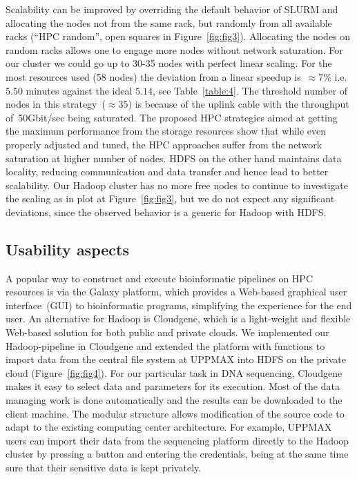 \documentclass[10pt]{article}
\begin{document}
Scalability can be improved by overriding the default behavior of SLURM and allocating the nodes not from the same rack, but randomly from all available racks (``HPC random'', open squares in Figure~\ref{fig:fig3}). Allocating the nodes on random racks allows one to engage more nodes without network saturation. For our cluster we could go up to 30-35 nodes with perfect linear scaling. For the most resources used (58 nodes) the deviation from a linear speedup is~$\approx 7\%$ i.e. $5.50$ minutes against the ideal $5.14$, see Table~\ref{table:4}. The threshold number of nodes in this strategy~($\approx35$) is because of the uplink cable with the throughput of~50Gbit/sec being saturated. 
The proposed HPC strategies aimed at getting the maximum performance from the storage resources show that while even properly adjusted and tuned, the HPC approaches suffer from the network saturation at higher number of nodes.
HDFS on the other hand maintains data locality, reducing communication and data transfer and hence lead to better scalability.
Our Hadoop cluster has no more free nodes to continue to investigate the scaling as in plot at Figure~\ref{fig:fig3}, but we do not expect any significant deviations, since the observed behavior is a generic for Hadoop with HDFS\cite{lin2010, Hadoop:Guide}. 


\subsection*{Usability aspects}
\label{subsectionIV_2}

A popular way to construct and execute bioinformatic pipelines on HPC resources is via the Galaxy\cite{galaxy} platform, which provides a Web-based graphical user interface~(GUI) to bioinformatic programs, simplifying the experience for the end user. 
An alternative for Hadoop is Cloudgene\cite{cloudgene}, which is a light-weight and flexible Web-based solution for both public and private clouds. We implemented our Hadoop-pipeline in Cloudgene and extended the platform with functions to import data from the central file system at UPPMAX into HDFS on the private cloud (Figure~\ref{fig:fig4}).
For our particular task in DNA sequencing, Cloudgene makes it easy to select data and parameters for its execution. Most of the data managing work is done automatically and the results can be downloaded to the client machine. The modular structure allows modification of the source code to adapt to the existing computing center architecture. For example, UPPMAX users can import their data from the sequencing platform directly to the Hadoop cluster by pressing a button and entering the credentials, being at the same time sure that their sensitive data is kept privately.
\end{document}
